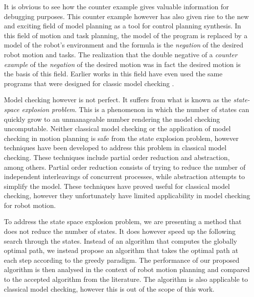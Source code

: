 It is obvious to see how the counter example gives valuable information for debugging purposes. This counter example however has also given rise to the new and exciting field of model planning as a tool for control planning synthesis. In this field of motion and task planning, the model of the program is replaced by a model of the robot's environment and the formula is the \textit{negation} of the desired robot motion and tasks. The realization that the double negative of a \textit{counter example} of the \textit{negation} of the desired motion was in fact the desired motion is the basis of this field. Earlier works in this field have even used the same programs that were designed for classic model checking \cite{fainekos05}. %

Model checking however is not perfect. It suffers from what is known as the \textit{state-space explosion problem}. This is a phenomenon in which the number of states can quickly grow to an unmanageable number rendering the model checking uncomputable. Neither classical model checking or the application of model checking in motion planning is safe from the state explosion problem, however techniques have been developed to address this problem in classical model checking. These techniques include partial order reduction and abstraction, among others. Partial order reduction consists of trying to reduce the number of independent interleavings of concurrent processes, while abstraction attempts to simplify the model. These techniques have proved useful for classical model checking, however they unfortunately have limited applicability in model checking for robot motion.  

To address the state space explosion problem, we are presenting a method that does not reduce the number of states. It does however speed up the following search through the states. Instead of an algorithm that computes the globally optimal path, we instead propose an algorithm that takes the optimal path at each step according to the greedy paradigm. The performance of our proposed algorithm is then analysed in the context of robot motion planning and compared to the accepted algorithm from the literature. The algorithm is also applicable to classical model checking, however this is out of the scope of this work. 

